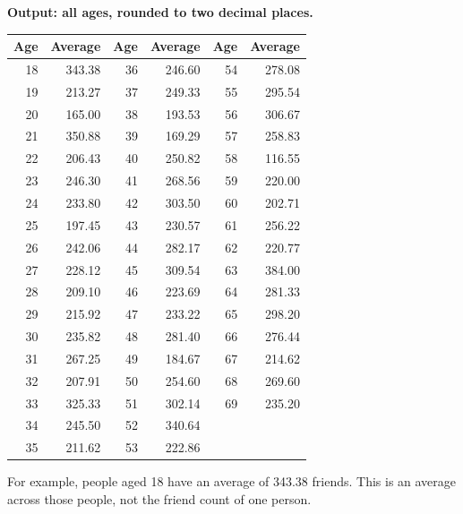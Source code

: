 \documentclass[10pt,a4paper]{article}
\begin{document}
\textbf{Output: all ages, rounded to two decimal places.}
\begin{center}
\begin{tabular}{rr@{\qquad}rr@{\qquad}rr}
\toprule
Age & Average & Age & Average & Age & Average \\
\midrule
18 & 343.38 & 36 & 246.60 & 54 & 278.08 \\
19 & 213.27 & 37 & 249.33 & 55 & 295.54 \\
20 & 165.00 & 38 & 193.53 & 56 & 306.67 \\
21 & 350.88 & 39 & 169.29 & 57 & 258.83 \\
22 & 206.43 & 40 & 250.82 & 58 & 116.55 \\
23 & 246.30 & 41 & 268.56 & 59 & 220.00 \\
24 & 233.80 & 42 & 303.50 & 60 & 202.71 \\
25 & 197.45 & 43 & 230.57 & 61 & 256.22 \\
26 & 242.06 & 44 & 282.17 & 62 & 220.77 \\
27 & 228.12 & 45 & 309.54 & 63 & 384.00 \\
28 & 209.10 & 46 & 223.69 & 64 & 281.33 \\
29 & 215.92 & 47 & 233.22 & 65 & 298.20 \\
30 & 235.82 & 48 & 281.40 & 66 & 276.44 \\
31 & 267.25 & 49 & 184.67 & 67 & 214.62 \\
32 & 207.91 & 50 & 254.60 & 68 & 269.60 \\
33 & 325.33 & 51 & 302.14 & 69 & 235.20 \\
34 & 245.50 & 52 & 340.64 &  &  \\
35 & 211.62 & 53 & 222.86 &  &  \\
\bottomrule
\end{tabular}
\end{center}
For example, people aged 18 have an average of 343.38 friends.
This is an average across those people, not the friend count of one person.
\end{document}
